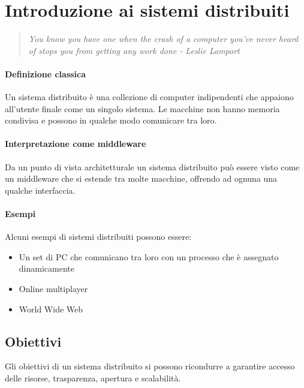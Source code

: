 \section{Introduzione ai sistemi distribuiti}

\begin{quote}
    \emph{You know you have one when the crash of a computer you've
    never heard of stops you from getting any work done - Leslie Lamport} 
\end{quote}

\paragraph{Definizione classica}
Un sistema distribuito è una collezione di computer indipendenti
che appaiono all'utente finale come un singolo sistema.
Le macchine non hanno memoria condivisa e possono in qualche modo 
comunicare tra loro.


\paragraph{Interpretazione come middleware}
Da un punto di vista architetturale un sistema distribuito può essere
 visto come un middleware che si estende tra molte macchine, offrendo 
ad ognuna una qualche interfaccia.

\paragraph{Esempi}
Alcuni esempi di sistemi distribuiti possono essere:
\begin{itemize}
    \item Un set di PC che comunicano tra loro con un 
    processo che è assegnato dinamicamente
    \item Online multiplayer
    \item World Wide Web 
\end{itemize}

\subsection{Obiettivi}
Gli obiettivi di un sistema distribuito si possono ricondurre a garantire
accesso delle risorse, trasparenza, apertura e scalabilità.

